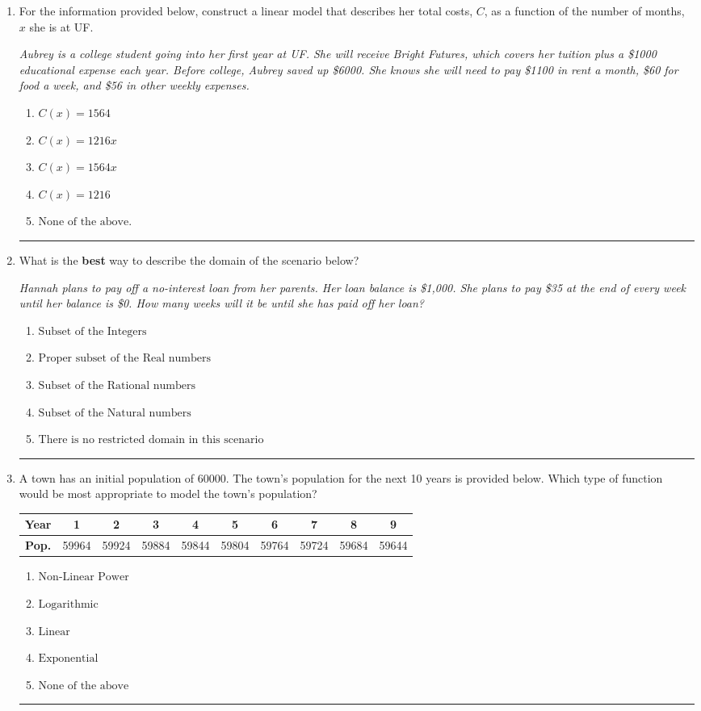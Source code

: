 \documentclass[14pt]{extbook}
\newcommand{\litem}[1]{\item#1\hspace*{-1cm}\rule{\textwidth}{0.4pt}}
\begin{document}
\begin{enumerate}
{\begin{enumerate}[label=\Alph*.]
\end{enumerate} }
\litem{
For the information provided below, construct a linear model that describes her total costs, $C$, as a function of the number of months, $x$ she is at UF. 
\begin{center}
    \textit{ Aubrey is a college student going into her first year at UF. She will receive Bright Futures, which covers her tuition plus a \$1000 educational expense each year. Before college, Aubrey saved up \$6000. She knows she will need to pay \$1100 in rent a month, \$60 for food a week, and \$56 in other weekly expenses. }
\end{center}
\begin{enumerate}[label=\Alph*.]
\item \( C(x) = 1564 \)
\item \( C(x) = 1216 x \)
\item \( C(x) = 1564 x \)
\item \( C(x) = 1216 \)
\item \( \text{None of the above.} \)

\end{enumerate} }
\litem{
What is the \textbf{best} way to describe the domain of the scenario below?
\begin{center}
    \textit{ Hannah plans to pay off a no-interest loan from her parents. Her loan balance is \$1,000. She plans to pay \$35 at the end of every week until her balance is \$0. How many weeks will it be until she has paid off her loan? }
\end{center}
\begin{enumerate}[label=\Alph*.]
\item \( \text{Subset of the Integers} \)
\item \( \text{Proper subset of the Real numbers} \)
\item \( \text{Subset of the Rational numbers} \)
\item \( \text{Subset of the Natural numbers} \)
\item \( \text{There is no restricted domain in this scenario} \)

\end{enumerate} }
\litem{
A town has an initial population of 60000. The town's population for the next 10 years is provided below. Which type of function would be most appropriate to model the town's population?


\begin{tabular}{c|c|c|c|c|c|c|c|c|c}
\textbf{Year} & 1 & 2 & 3 & 4 & 5 & 6 & 7 & 8 & 9 \tabularnewline
\hline
\textbf{Pop.} & 59964 & 59924 & 59884 & 59844 & 59804 & 59764 & 59724 & 59684 & 59644
\end{tabular} \begin{enumerate}[label=\Alph*.]
\item \( \text{Non-Linear Power} \)
\item \( \text{Logarithmic} \)
\item \( \text{Linear} \)
\item \( \text{Exponential} \)
\item \( \text{None of the above} \)

\end{enumerate} }
\end{enumerate}
\end{document}
